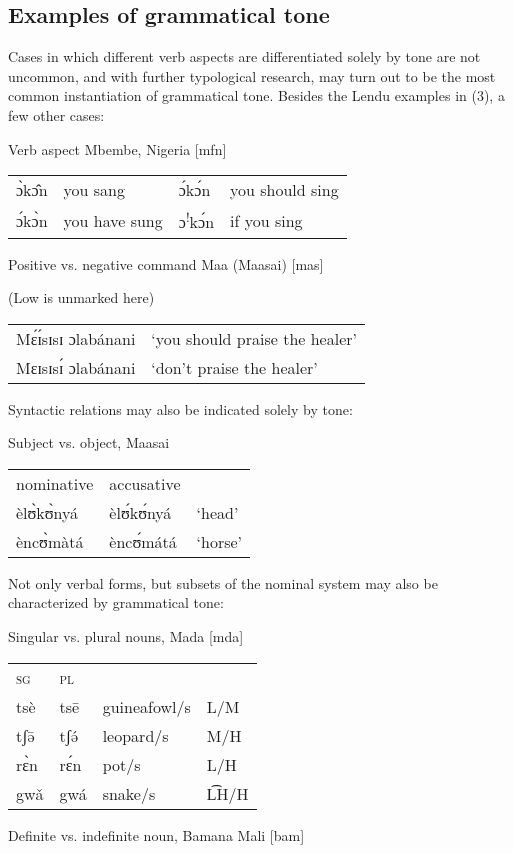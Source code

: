 \documentclass[output=paper]{langscibook}
\begin{document}
\subsection{Examples of grammatical tone}
Cases in which different verb aspects are differentiated solely by tone are not uncommon, and with further typological research, may turn out to be the most common instantiation of grammatical tone. Besides the Lendu examples in (3), a few other cases:

\ea 
Verb aspect     Mbembe, Nigeria [mfn] \citep{Barnwell1969}

\begin{tabular}{@{}llll@{}}
ɔ̀kɔ̂n  &   you sang &	ɔ́kɔ́n &     you should sing\\
ɔ́kɔ̀n &   you have sung & ɔ\textsuperscript{!}kɔ́n   & if you sing\\
\end{tabular}
\ex
Positive vs. negative command	Maa (Maasai) [mas] \citep{Payne2019}

(Low is unmarked here)

\begin{tabular}{@{}ll@{}}
Mɛ́ɪ́sɪsɪ ɔlabánani &	‘you should praise the healer’\\
Mɛɪsɪsɪ́ ɔlabánani &	‘don’t praise the healer’\\
\end{tabular}
\z

Syntactic relations may also be indicated solely by tone:

\ea 
Subject vs. object, Maasai \citep{Tucker1955}

\begin{tabular}{@{}lll@{}}
nominative	&	accusative &\\
èlʊ̀kʊ̀nyá &èlʊ́kʊ́nyá &   ‘head’\\
èncʊ̀màtá &  èncʊ́mátá&   ‘horse’\\
\end{tabular}
\z

Not only verbal forms, but subsets of the nominal system may also be characterized by grammatical tone:

\ea
Singular vs. plural nouns, Mada [mda] \citep{Snider2007}

\begin{tabular}{@{}llll@{}}
\textsc{sg} & \textsc{pl} & { } & { } \\
tsè & tsē&	guineafowl/s&  L/M\\
tʃə̄  & tʃə́& leopard/s& M/H \\
rɛ̀n&  rɛ́n&  pot/s &  L/H\\
gwǎ  &gwá  &snake/s  &L͡H/H\\
\end{tabular}
\ex
Definite vs. indefinite noun,  Bamana Mali [bam] \citep[pc]{Vydrin2016}
\end{document}
